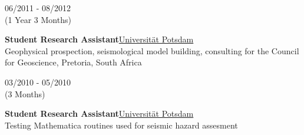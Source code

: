 \documentclass{article}
\begin{document}
\begin{minipage}[t]{0.7\textwidth}
		\begin{minipage}[t]{0.3\textwidth}
		06/2011 - 08/2012 \\ (1 Year 3 Months)
		\end{minipage}
		\hfill
		\begin{minipage}[t]{0.7\textwidth}
		\textbf{Student Research Assistant}\hfill \href{https://www.uni-potsdam.de/}{\color{pblue}Universität Potsdam}\\
	    Geophysical prospection, seismological model building, consulting for the Council for Geoscience, Pretoria, South Africa
		\end{minipage}\vspace{0.5cm}
		
		\begin{minipage}[t]{0.3\textwidth}
		03/2010 - 05/2010 \\ (3 Months)
		\end{minipage}
		\hfill
		\begin{minipage}[t]{0.7\textwidth}
		\textbf{Student Research Assistant}\hfill \href{https://www.uni-potsdam.de/}{\color{pblue}Universität Potsdam}\\
	    Testing Mathematica routines used for seismic hazard assesment
		\end{minipage}
\end{minipage}
\end{document}
